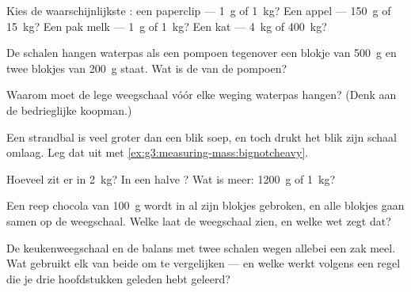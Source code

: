 \begin{exercise}[$\star$]\label{exo:g3:measuring-mass:2}
Kies de waarschijnlijkste : een paperclip --- \qty{1}{g} of
\qty{1}{kg}? Een appel --- \qty{150}{g} of \qty{15}{kg}? Een pak melk
--- \qty{1}{g} of \qty{1}{kg}? Een kat --- \qty{4}{kg} of
\qty{400}{kg}?
\end{exercise}

\begin{exercise}[$\star$]\label{exo:g3:measuring-mass:3}
De schalen hangen waterpas als een pompoen tegenover een blokje van
\qty{500}{g} en twee blokjes van \qty{200}{g} staat. Wat is de
 van de pompoen?
\end{exercise}

\begin{exercise}[$\star$]\label{exo:g3:measuring-mass:4}
Waarom moet de lege weegschaal vóór elke weging waterpas hangen?
(Denk aan de bedrieglijke koopman.)
\end{exercise}

\begin{exercise}[$\star$]\label{exo:g3:measuring-mass:5}
Een strandbal is veel groter dan een blik soep, en toch drukt het blik
zijn schaal omlaag. Leg dat uit met
\cref{ex:g3:measuring-mass:bignotcheavy}.
\end{exercise}

\begin{exercise}[$\star$]\label{exo:g3:measuring-mass:6}
Hoeveel  zit er in \qty{2}{kg}? In een halve ? Wat is
meer: \qty{1200}{g} of \qty{1}{kg}?
\end{exercise}

\begin{exercise}[$\star$]\label{exo:g3:measuring-mass:7}
Een reep chocola van \qty{100}{g} wordt in al zijn blokjes gebroken,
en alle blokjes gaan samen op de weegschaal. Welke  laat de
weegschaal zien, en welke wet zegt dat?
\end{exercise}

\begin{exercise}[$\star$]\label{exo:g3:measuring-mass:8}
De keukenweegschaal en de balans met twee schalen wegen allebei een
zak meel. Wat gebruikt elk van beide om te vergelijken --- en welke
werkt volgens een regel die je drie hoofdstukken geleden hebt geleerd?
\end{exercise}

